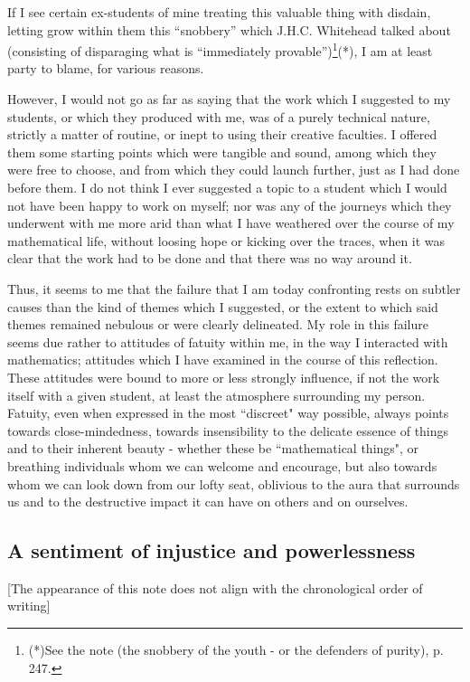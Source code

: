 If I see certain ex-students of mine treating this valuable thing with disdain, 
letting grow within them
this ``snobbery'' which J.H.C. Whitehead talked about (consisting of disparaging 
what is ``immediately provable'')\footnote{(*)See the 
note (the snobbery of the youth - or the defenders of purity),  p. 247.
}(*), 
I am at least party to blame, for various reasons. 


However, I would not go as far as saying that the work which I suggested to my students, or which they produced with me, was of a purely technical nature, strictly a matter of routine, or inept to using their creative faculties. I offered them some starting points which were tangible and sound, among which they were free to choose, and from which they could launch further, just as I had done before them. I do not think I ever suggested a topic to a student which I would not have been happy to work on myself; nor was any of the journeys which they underwent with me more arid than what I have weathered over the course of my mathematical life, without loosing hope or kicking over the traces, when it was clear that the work had to be done and that there was no way around it. 

Thus, it seems to me that the failure that I am today confronting rests on subtler causes than the kind of themes which I suggested, or the extent to which said themes remained nebulous or were clearly delineated. My role in this failure seems due rather to attitudes of fatuity within me, in the way I interacted with mathematics; attitudes which I have examined in the course of this reflection. These attitudes were bound to more or less strongly influence, if not the work itself with a given student, at least the atmosphere surrounding my person. Fatuity, even when expressed in the most ``discreet" way possible, always points towards close-mindedness, towards insensibility to the delicate essence of things and to their inherent beauty - whether these be ``mathematical things", or breathing individuals whom we can welcome and encourage, but also towards whom we can look down from our lofty seat, oblivious to the aura that surrounds us and to the destructive impact it can have on others and on ourselves.

\subsection{A sentiment of injustice and powerlessness}

 [The appearance of this note does not align with the chronological order of writing]

